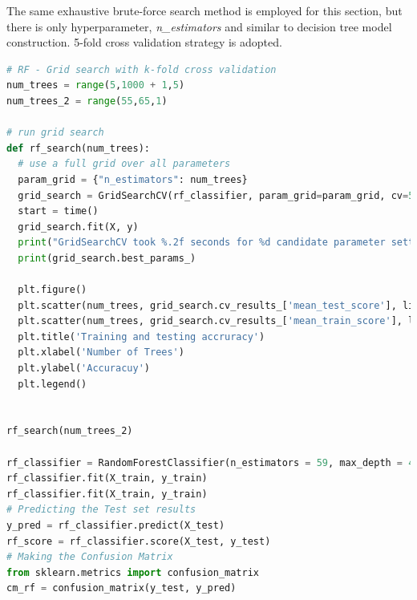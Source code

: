 \documentclass[11pt]{article}
\begin{document}
The same exhaustive brute-force search method is employed for this section, but there is only hyperparameter, \emph{n\_estimators} and similar to decision tree model construction. 5-fold cross validation strategy is adopted. 

\begin{lstlisting}[language=Python, basicstyle=\tiny, caption=Python code snippet for fine tuning the \underline{Random Forest} classifier]
# RF - Grid search with k-fold cross validation
num_trees = range(5,1000 + 1,5)
num_trees_2 = range(55,65,1)

# run grid search
def rf_search(num_trees):
  # use a full grid over all parameters
  param_grid = {"n_estimators": num_trees}
  grid_search = GridSearchCV(rf_classifier, param_grid=param_grid, cv=5, n_jobs = -1, return_train_score=True)
  start = time()
  grid_search.fit(X, y)
  print("GridSearchCV took %.2f seconds for %d candidate parameter settings." % (time() - start, len(grid_search.cv_results_['params'])))
  print(grid_search.best_params_)
  
  plt.figure()
  plt.scatter(num_trees, grid_search.cv_results_['mean_test_score'], linestyle  = 'dotted', label = 'Test')
  plt.scatter(num_trees, grid_search.cv_results_['mean_train_score'], linestyle  = 'dotted', label = 'Training')
  plt.title('Training and testing accruracy')
  plt.xlabel('Number of Trees')
  plt.ylabel('Accuracuy')
  plt.legend()
  
 
rf_search(num_trees_2)
  
rf_classifier = RandomForestClassifier(n_estimators = 59, max_depth = 4, min_samples_split = 36, random_state = 0)
rf_classifier.fit(X_train, y_train)
rf_classifier.fit(X_train, y_train)
# Predicting the Test set results
y_pred = rf_classifier.predict(X_test)
rf_score = rf_classifier.score(X_test, y_test)
# Making the Confusion Matrix
from sklearn.metrics import confusion_matrix
cm_rf = confusion_matrix(y_test, y_pred)
\end{lstlisting}
\end{document}

